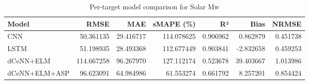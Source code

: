 \begin{table}
\caption{Per-target model comparison for Solar Mw}
\begin{tabular}{lrrrrrr}
\toprule
Model & RMSE & MAE & sMAPE (\%) & R² & Bias & NRMSE \\
\midrule
CNN & 50.361135 & 29.416717 & 114.078625 & 0.906962 & 0.862879 & 0.451738 \\
LSTM & 51.198935 & 28.493368 & 112.677449 & 0.903841 & -2.832658 & 0.459253 \\
dCeNN+ELM & 114.667258 & 96.267970 & 127.112174 & 0.523678 & 39.403667 & 1.013986 \\
dCeNN+ELM+ASP & 96.623091 & 64.984986 & 61.553274 & 0.661792 & 8.257201 & 0.854424 \\
\bottomrule
\end{tabular}
\end{table}
